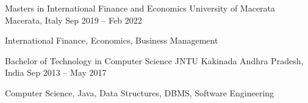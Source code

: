 \begin{cventries}
  \cventry
    {Masters in International Finance and Economics}
    {University of Macerata}
    {Macerata, Italy}
    {Sep 2019 -- Feb 2022}
    {
      \begin{cvitems}
        \item {International Finance, Economics, Business Management}
      \end{cvitems}
    }
  \cventry
    {Bachelor of Technology in Computer Science}
    {JNTU Kakinada}
    {Andhra Pradesh, India}
    {Sep 2013 -- May 2017}
    {
      \begin{cvitems}
        \item {Computer Science, Java, Data Structures, DBMS, Software Engineering}
      \end{cvitems}
    }
\end{cventries}